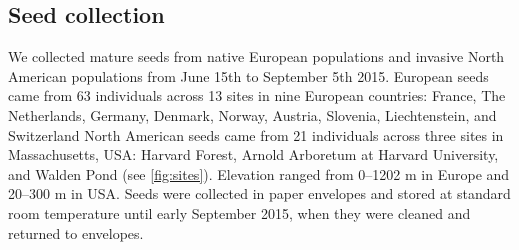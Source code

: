 \documentclass[12pt]{article}\usepackage[]{graphicx}\usepackage[]{color}
\begin{document}
	\subsection{Seed collection} 
	We collected mature seeds from native European populations and invasive North American populations from June 15th to September 5th 2015. European seeds came from 63 individuals across 13 sites in nine European countries: France, The Netherlands, Germany, Denmark, Norway, Austria, Slovenia, Liechtenstein, and Switzerland North American seeds came from 21 individuals across three sites  in Massachusetts, USA: Harvard Forest, Arnold Arboretum at Harvard University, and Walden Pond (see \ref{fig:sites}). Elevation ranged from 0--1202 m in Europe and 20--300 m in USA. Seeds were collected in paper envelopes and stored at standard room temperature until early September 2015, when they were cleaned and returned to envelopes.  %
	
	
\end{document}

